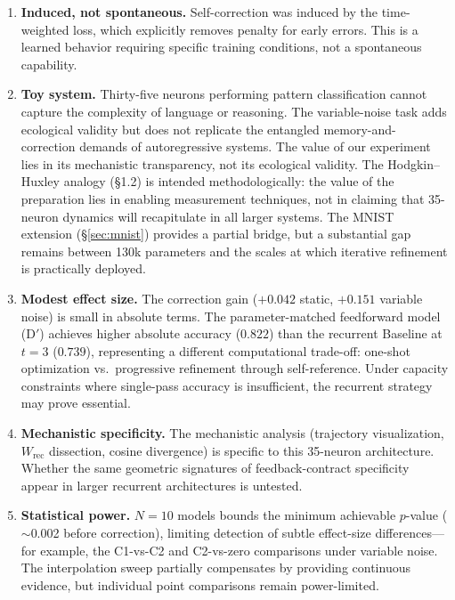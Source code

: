 \documentclass[10pt]{article}
\begin{document}
\begin{enumerate}

\item \textbf{Induced, not spontaneous.} Self-correction was induced by the time-weighted loss, which explicitly removes penalty for early errors. This is a learned behavior requiring specific training conditions, not a spontaneous capability.

\item \textbf{Toy system.} Thirty-five neurons performing pattern classification cannot capture the complexity of language or reasoning. The variable-noise task adds ecological validity but does not replicate the entangled memory-and-correction demands of autoregressive systems. The value of our experiment lies in its mechanistic transparency, not its ecological validity. The Hodgkin--Huxley analogy (\S1.2) is intended methodologically: the value of the preparation lies in enabling measurement techniques, not in claiming that 35-neuron dynamics will recapitulate in all larger systems. The MNIST extension (\S\ref{sec:mnist}) provides a partial bridge, but a substantial gap remains between 130k parameters and the scales at which iterative refinement is practically deployed.

\item \textbf{Modest effect size.} The correction gain ($+0.042$ static, $+0.151$ variable noise) is small in absolute terms. The parameter-matched feedforward model (D$'$) achieves higher absolute accuracy ($0.822$) than the recurrent Baseline at $t{=}3$ ($0.739$), representing a different computational trade-off: one-shot optimization vs.\ progressive refinement through self-reference. Under capacity constraints where single-pass accuracy is insufficient, the recurrent strategy may prove essential.

\item \textbf{Mechanistic specificity.} The mechanistic analysis (trajectory visualization, $W_\text{rec}$ dissection, cosine divergence) is specific to this 35-neuron architecture. Whether the same geometric signatures of feedback-contract specificity appear in larger recurrent architectures is untested.

\item \textbf{Statistical power.} $N{=}10$ models bounds the minimum achievable $p$-value ($\sim$0.002 before correction), limiting detection of subtle effect-size differences---for example, the C1-vs-C2 and C2-vs-zero comparisons under variable noise. The interpolation sweep partially compensates by providing continuous evidence, but individual point comparisons remain power-limited.


\end{enumerate}
\end{document}
